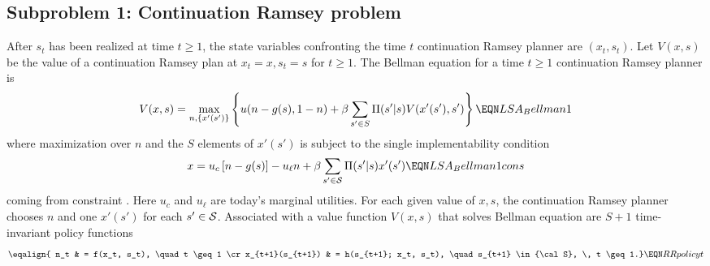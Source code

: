 \subsection{Subproblem 1: Continuation Ramsey problem}
 After $s_t$ has been realized at time $t \geq 1$, the state variables confronting the
time $t$ continuation Ramsey planner  are $(x_t, s_t)$.  Let $V(x, s)$ be the  value of a continuation
Ramsey plan at $x_t = x, s_t =s$ for $t \geq 1$.
The  Bellman equation for a time $t \geq 1$ continuation Ramsey planner is
$$ V(x, s) = \max_{n, \{x'(s')\}} \left\{u(n-g(s), 1-n) + \beta \sum_{s'\in S} \Pi(s'| s) V(x'(s'), s') \right\}\EQN LSA_Bellman1 $$
where  maximization over $n$ and the  $S$ elements of $x'(s')$ is subject to the
single implementability condition %
$$ x = u_c\left[n-g(s)\right] -  u_\ell n + \beta \sum_{s' \in {\cal S}} \Pi(s'|s) x'(s')   \EQN LSA_Bellman1cons $$
coming from constraint .
Here $u_c$ and $u_\ell$ are today's  marginal utilities.
For each given value of $x, s$, the continuation Ramsey planner chooses $n$ and  one $x'(s')$ for each $s' \in {\cal S}$.
Associated with a value function $V(x,s)$ that solves  Bellman equation  are $S+1$ time-invariant  policy functions
$$ \eqalign{ n_t & = f(x_t, s_t), \quad t \geq 1 \cr
             x_{t+1}(s_{t+1}) & = h(s_{t+1}; x_t, s_t), \quad s_{t+1} \in  {\cal S}, \, t \geq 1.} \EQN RRpolicyt $$

